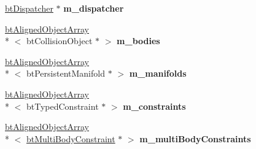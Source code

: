 \begin{DoxyCompactItemize}
\item 
\hypertarget{struct_multi_body_inplace_solver_island_callback_ac8cfb422a95e2c160925f3737538e7dd}{\hyperlink{classbt_dispatcher}{bt\+Dispatcher} $\ast$ {\bfseries m\+\_\+dispatcher}}\label{struct_multi_body_inplace_solver_island_callback_ac8cfb422a95e2c160925f3737538e7dd}

\item 
\hypertarget{struct_multi_body_inplace_solver_island_callback_adc3284709ad82e2a864374629454770a}{\hyperlink{classbt_aligned_object_array}{bt\+Aligned\+Object\+Array}\\*
$<$ bt\+Collision\+Object $\ast$ $>$ {\bfseries m\+\_\+bodies}}\label{struct_multi_body_inplace_solver_island_callback_adc3284709ad82e2a864374629454770a}

\item 
\hypertarget{struct_multi_body_inplace_solver_island_callback_ac75aa7916f93b3f00228e8279d90b681}{\hyperlink{classbt_aligned_object_array}{bt\+Aligned\+Object\+Array}\\*
$<$ bt\+Persistent\+Manifold $\ast$ $>$ {\bfseries m\+\_\+manifolds}}\label{struct_multi_body_inplace_solver_island_callback_ac75aa7916f93b3f00228e8279d90b681}

\item 
\hypertarget{struct_multi_body_inplace_solver_island_callback_a263a82f0c95e0d5e770886d8a74d51ce}{\hyperlink{classbt_aligned_object_array}{bt\+Aligned\+Object\+Array}\\*
$<$ bt\+Typed\+Constraint $\ast$ $>$ {\bfseries m\+\_\+constraints}}\label{struct_multi_body_inplace_solver_island_callback_a263a82f0c95e0d5e770886d8a74d51ce}

\item 
\hypertarget{struct_multi_body_inplace_solver_island_callback_a3d99e0484bb15883837b84d232e22796}{\hyperlink{classbt_aligned_object_array}{bt\+Aligned\+Object\+Array}\\*
$<$ \hyperlink{classbt_multi_body_constraint}{bt\+Multi\+Body\+Constraint} $\ast$ $>$ {\bfseries m\+\_\+multi\+Body\+Constraints}}\label{struct_multi_body_inplace_solver_island_callback_a3d99e0484bb15883837b84d232e22796}

\end{DoxyCompactItemize}


